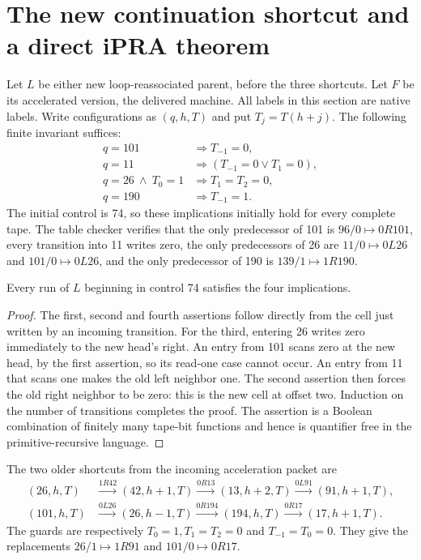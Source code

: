 \section{The new continuation shortcut and a direct iPRA theorem}
\label{sec:shortcut}
Let $L$ be either new loop-reassociated parent, before the three shortcuts.
Let $F$ be its accelerated version, the delivered machine. All labels in
this section are native labels. Write configurations as $(q,h,T)$ and put
$T_j=T(h+j)$. The following finite invariant suffices:
\begin{align*}
q=101&\Longrightarrow T_{-1}=0,\\
q=11&\Longrightarrow (T_{-1}=0\lor T_1=0),\\
q=26\ \land\ T_0=1&\Longrightarrow T_1=T_2=0,\\
q=190&\Longrightarrow T_{-1}=1.
\end{align*}
The initial control is 74, so these implications initially hold for every
complete tape. The table checker verifies that the only predecessor of
101 is $96/0\mapsto0R101$, every transition into 11 writes zero, the only
predecessors of 26 are $11/0\mapsto0L26$ and $101/0\mapsto0L26$, and the
only predecessor of 190 is $139/1\mapsto1R190$.

\begin{lemma}
Every run of $L$ beginning in control 74 satisfies the four implications.
\end{lemma}
\begin{proof}
The first, second and fourth assertions follow directly from the cell just
written by an incoming transition. For the third, entering 26 writes zero
immediately to the new head's right. An entry from 101 scans zero at the
new head, by the first assertion, so its read-one case cannot occur. An
entry from 11 that scans one makes the old left neighbor one. The second
assertion then forces the old right neighbor to be zero: this is the new
cell at offset two. Induction on the number of transitions completes the
proof. The assertion is a Boolean combination of finitely many tape-bit
functions and hence is quantifier free in the primitive-recursive language.
\end{proof}

The two older shortcuts from the incoming acceleration packet are
\begin{align*}
(26,h,T)&\xrightarrow{1R42}(42,h+1,T)
 \xrightarrow{0R13}(13,h+2,T)\xrightarrow{0L91}(91,h+1,T),\\
(101,h,T)&\xrightarrow{0L26}(26,h-1,T)
 \xrightarrow{0R194}(194,h,T)\xrightarrow{0R17}(17,h+1,T).
\end{align*}
The guards are respectively $T_0=1,T_1=T_2=0$ and $T_{-1}=T_0=0$.
They give the replacements $26/1\mapsto1R91$ and
$101/0\mapsto0R17$.

